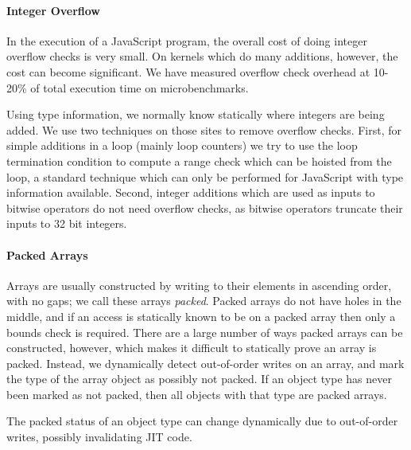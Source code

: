 \paragraph{Integer Overflow}

In the execution of a JavaScript program, the overall cost of doing integer
overflow checks is very small.
On kernels which do many additions, however, the cost can become significant.
We have measured overflow check overhead at 10-20\% of total execution
time on microbenchmarks.

Using type information, we normally know statically where integers are being
added. We use two techniques on those sites to remove overflow checks.
First, for simple additions in a loop (mainly loop counters) we try to use
the loop termination condition to compute a range
check which can be hoisted from the loop, a standard technique
which can only be performed for JavaScript with type information available.
Second, integer additions which are used as inputs to bitwise operators
do not need overflow checks, as bitwise operators truncate their inputs to 32
bit integers.

\paragraph{Packed Arrays}

Arrays are usually constructed by writing to their elements in ascending
order, with no gaps; we call these arrays {\it packed}.
Packed arrays do not have holes in the middle, and if an access is statically
known to be on a packed array then only a bounds check is required.
There are a large number of ways packed arrays can be constructed, however,
which makes it difficult to statically prove an array is packed.
Instead, we dynamically detect out-of-order writes on an array,
and mark the type of the array object as possibly not packed.
If an object type has never been marked as not packed, then all objects
with that type are packed arrays.


The packed status of an object type can change dynamically due to out-of-order
writes, possibly invalidating JIT code.

